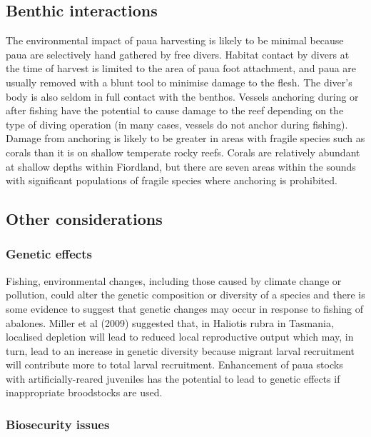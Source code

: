 \documentclass{mpi-plenary}
\theoremstyle{definition}
\theoremstyle{definition}
\theoremstyle{definition}
\theoremstyle{remark}
\begin{document}
\subsection{Benthic interactions}\label{benthic-interactions}

The environmental impact of paua harvesting is likely to be minimal
because paua are selectively hand gathered by free divers. Habitat
contact by divers at the time of harvest is limited to the area of paua
foot attachment, and paua are usually removed with a blunt tool to
minimise damage to the flesh. The diver's body is also seldom in full
contact with the benthos. Vessels anchoring during or after fishing have
the potential to cause damage to the reef depending on the type of
diving operation (in many cases, vessels do not anchor during fishing).
Damage from anchoring is likely to be greater in areas with fragile
species such as corals than it is on shallow temperate rocky reefs.
Corals are relatively abundant at shallow depths within Fiordland, but
there are seven areas within the sounds with significant populations of
fragile species where anchoring is prohibited.

\subsection{Other considerations}\label{other-considerations}

\subsubsection{Genetic effects}\label{genetic-effects}

Fishing, environmental changes, including those caused by climate change
or pollution, could alter the genetic composition or diversity of a
species and there is some evidence to suggest that genetic changes may
occur in response to fishing of abalones. Miller et al (2009) suggested
that, in Haliotis rubra in Tasmania, localised depletion will lead to
reduced local reproductive output which may, in turn, lead to an
increase in genetic diversity because migrant larval recruitment will
contribute more to total larval recruitment. Enhancement of paua stocks
with artificially-reared juveniles has the potential to lead to genetic
effects if inappropriate broodstocks are used.

\subsubsection{Biosecurity issues}\label{biosecurity-issues}
\end{document}
